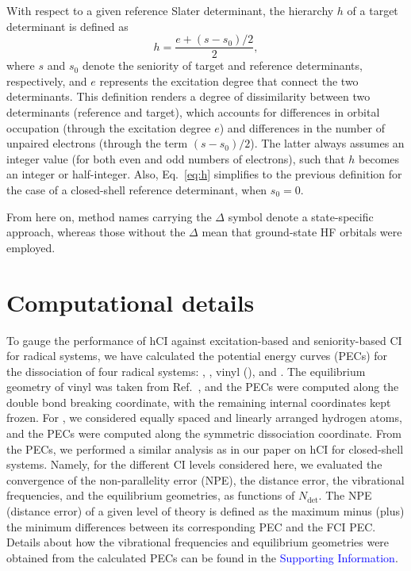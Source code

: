 \documentclass[aip,jcp,reprint,noshowkeys,superscriptaddress]{revtex4-1}
\newcommand{\SupInf}{\textcolor{blue}{Supporting Information}}
\newcommand{\Ndet}{N_\text{det}}
\begin{document}
With respect to a given reference Slater determinant, the hierarchy $h$ of a target determinant is defined as
\begin{equation}
        \label{eq:h}
	h = \frac{e+ (s-s_0)/2}{2},
\end{equation}
where $s$ and $s_0$ denote the seniority of target and reference determinants, respectively, and $e$ represents the excitation degree that connect the two determinants.
This definition renders a degree of dissimilarity between two determinants (reference and target),
which accounts for differences in orbital occupation (through the excitation degree $e$)
and differences in the number of unpaired electrons (through the term $(s-s_0)/2$).
The latter always assumes an integer value (for both even and odd numbers of electrons), such that $h$ becomes an integer or half-integer.
Also, Eq.~\eqref{eq:h} simplifies to the previous definition \cite{Kossoski_2022} for the case of a closed-shell reference determinant, when $s_0 = 0$.

From here on, method names carrying the $\Delta$ symbol denote a state-specific approach,
whereas those without the $\Delta$ mean that ground-state HF orbitals were employed.

\section{Computational details}
\label{sec:compdet}

To gauge the performance of hCI against excitation-based and seniority-based CI for radical systems,
we have calculated the potential energy curves (PECs) for the dissociation of four radical systems:
, , vinyl (), and .
The equilibrium geometry of vinyl was taken from Ref.~,
and the PECs were computed along the  double bond breaking coordinate, with the remaining internal coordinates kept frozen.
For , we considered equally spaced and linearly arranged hydrogen atoms, and the PECs were computed along the symmetric dissociation coordinate.
From the PECs, we performed a similar analysis as in our paper on hCI for closed-shell systems. \cite{Kossoski_2022}
Namely, for the different CI levels considered here, 
we evaluated the convergence of the non-parallelity error (NPE), the distance error, the vibrational frequencies, and the equilibrium geometries, as functions of $\Ndet$.
The NPE (distance error) of a given level of theory is defined as the maximum minus (plus) the minimum differences between its corresponding PEC and the FCI PEC.
Details about how the vibrational frequencies and equilibrium geometries were obtained from the calculated PECs can be found in the \SupInf.
\end{document}
